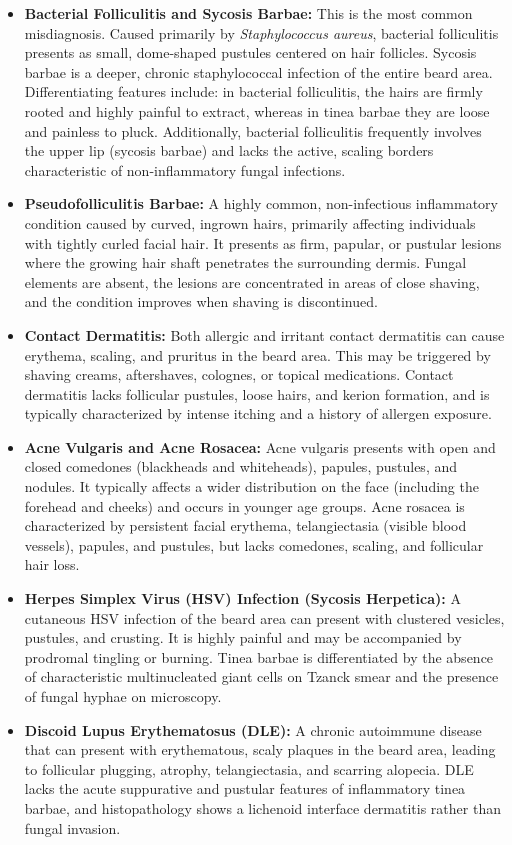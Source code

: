 \begin{itemize}
    \item \textbf{Bacterial Folliculitis and Sycosis Barbae:} This is the most common misdiagnosis. Caused primarily by \textit{Staphylococcus aureus}, bacterial folliculitis presents as small, dome-shaped pustules centered on hair follicles. Sycosis barbae is a deeper, chronic staphylococcal infection of the entire beard area. Differentiating features include: in bacterial folliculitis, the hairs are firmly rooted and highly painful to extract, whereas in tinea barbae they are loose and painless to pluck. Additionally, bacterial folliculitis frequently involves the upper lip (sycosis barbae) and lacks the active, scaling borders characteristic of non-inflammatory fungal infections.
    \item \textbf{Pseudofolliculitis Barbae:} A highly common, non-infectious inflammatory condition caused by curved, ingrown hairs, primarily affecting individuals with tightly curled facial hair. It presents as firm, papular, or pustular lesions where the growing hair shaft penetrates the surrounding dermis. Fungal elements are absent, the lesions are concentrated in areas of close shaving, and the condition improves when shaving is discontinued.
    \item \textbf{Contact Dermatitis:} Both allergic and irritant contact dermatitis can cause erythema, scaling, and pruritus in the beard area. This may be triggered by shaving creams, aftershaves, colognes, or topical medications. Contact dermatitis lacks follicular pustules, loose hairs, and kerion formation, and is typically characterized by intense itching and a history of allergen exposure.
    \item \textbf{Acne Vulgaris and Acne Rosacea:} Acne vulgaris presents with open and closed comedones (blackheads and whiteheads), papules, pustules, and nodules. It typically affects a wider distribution on the face (including the forehead and cheeks) and occurs in younger age groups. Acne rosacea is characterized by persistent facial erythema, telangiectasia (visible blood vessels), papules, and pustules, but lacks comedones, scaling, and follicular hair loss.
    \item \textbf{Herpes Simplex Virus (HSV) Infection (Sycosis Herpetica):} A cutaneous HSV infection of the beard area can present with clustered vesicles, pustules, and crusting. It is highly painful and may be accompanied by prodromal tingling or burning. Tinea barbae is differentiated by the absence of characteristic multinucleated giant cells on Tzanck smear and the presence of fungal hyphae on microscopy.
    \item \textbf{Discoid Lupus Erythematosus (DLE):} A chronic autoimmune disease that can present with erythematous, scaly plaques in the beard area, leading to follicular plugging, atrophy, telangiectasia, and scarring alopecia. DLE lacks the acute suppurative and pustular features of inflammatory tinea barbae, and histopathology shows a lichenoid interface dermatitis rather than fungal invasion.
\end{itemize}

